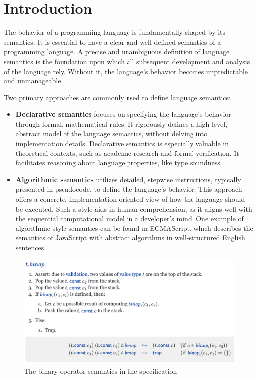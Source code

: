 \section{Introduction}\label{sec:intro}
The behavior of a programming language is fundamentally shaped by its semantics. 
It is essential to have a clear and well-defined semantics of a programming language. 
A precise and unambiguous definition of language semantics is the foundation upon which all subsequent development and analysis of the language rely. 
Without it, the language’s behavior becomes unpredictable and unmanageable.

Two primary approaches are commonly used to define language semantics:
\begin{itemize}
  \item 
    \textbf{Declarative semantics} focuses on specifying the language’s behavior through formal, mathematical rules. 
    It rigorously defines a high-level, abstract model of the language semantics, without delving into implementation details. 
    Declarative semantics is especially valuable in theoretical contexts, such as academic research and formal verification. 
    It facilitates reasoning about language properties, like type soundness.
  \item 
    \textbf{Algorithmic semantics} utilizes detailed, stepwise instructions, typically presented in pseudocode, to define the language's behavior. 
    This approach offers a concrete, implementation-oriented view of how the language should be executed. 
    Such a style aids in human comprehension, as it aligns well with the sequential computational model in a developer's mind. 
    One example of algorithmic style semantics can be found in ECMAScript, which describes the semantics of JavaScript with abstract algorithms in well-structured English sentences.
\end{itemize}

\begin{figure}[t]
\includegraphics[width=.7\textwidth]{../img/spec.png}
\caption{The binary operator semantics in the specification}
\label{fig:spec}
\end{figure}

